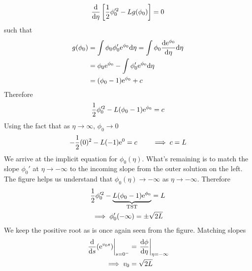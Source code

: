 \begin{gather*}
	\frac{\mathrm{d}}{\mathrm{d} \eta } \left[\frac{1}{2} \phi_0'^2 - Lg(\phi_0) \right] = 0
\end{gather*}
such that
\begin{align*}
	g(\phi_0) &= \int   \phi_0 \phi_0' \mathrm{e}^{\phi_0} \mathrm{d} \eta = \int \phi_0 \frac{\mathrm{d} \mathrm{e}^{\phi_0}}{\mathrm{d} \eta}  \mathrm{d} \eta \\
	&= \phi_0 \mathrm{e}^{\phi_0} - \int \phi_0' \mathrm{e}^{\phi_0} \mathrm{d} \eta \\
	&= (\phi_0-1) \mathrm{e}^{\phi_0} + c
\end{align*}
Therefore 
\begin{gather*}
	\frac{1}{2} \phi_0'^2 - L(\phi_0 - 1)\mathrm{e}^{\phi_0} = c
\end{gather*}
Using the fact that as $\eta \rightarrow \infty$, $\phi_0 \rightarrow 0$ 
\begin{align*}
	-\frac{1}{2}(0)^2 -L(-1)\mathrm{e}^0 = c \qquad \implies c=L
\end{align*}
We arrive at the implicit equation for $\phi_0 (\eta)$. What's remaining is to match the slope $\phi_0'$ at $\eta \rightarrow -\infty$ to the incoming slope from the outer solution on the left. The figure helps us understand that $\phi_0(\eta) \rightarrow -\infty$ as $\eta \rightarrow -\infty$. Therefore
\begin{gather*}
\frac{1}{2} \phi_0'^2 - \underbrace{L(\phi_0 - 1)\mathrm{e}^{\phi_0}}_\text{TST} = L \\
\implies \phi_0'(-\infty) = \pm \sqrt{2L}
\end{gather*}
We keep the positive root as is once again seen from the figure. Matching slopes
\begin{align*}
	\left. \frac{\mathrm{d}}{\mathrm{d} s} (\mathrm{e}^{v_0 s})\right|_{s=0^-} &= \left. \frac{\mathrm{d} \phi}{\mathrm{d} \eta}\right|_{\eta = -\infty} \\
	\implies v_0 &= \sqrt{2L}
\end{align*}










